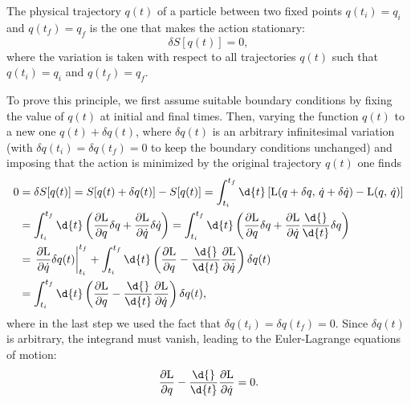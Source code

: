 \begin{theorem}
    The physical trajectory \(q(t)\) of a particle between two fixed points \(q(t_i) = q_i\) and \(q(t_f) = q_f\) is the one that makes the action stationary:
    \[
        \delta S[q(t)] = 0,
    \]
    where the variation is taken with respect to all trajectories \(q(t)\) such that \(q(t_i) = q_i\) and \(q(t_f) = q_f\).
\end{theorem}
To prove this principle, we first assume suitable boundary conditions by fixing the value of $q(t)$ at initial and final times. Then, varying the function $q(t)$ to a new one $q(t) + \delta q(t)$, where $\delta q(t)$ is an arbitrary infinitesimal variation (with $\delta q(t_i) = \delta q(t_f) = 0$ to keep the boundary conditions unchanged) and imposing that the action is minimized by the original trajectory $q(t)$ one finds
\[
    \begin{aligned}
        0 & = \delta S[q(t)] = S[q(t) + \delta q(t)] - S[q(t)] = \int_{t_i}^{t_f} \d{t} \left[ \mathrm{L}(q + \delta q,\,\dot{q} + \delta \dot{q}) - \mathrm{L}(q,\,\dot{q}) \right]                                                                                                                                                 \\
          & = \int_{t_i}^{t_f} \d{t} \left( \frac{\partial \mathrm{L}}{\partial q} \delta q + \frac{\partial \mathrm{L}}{\partial \dot{q}} \delta \dot{q} \right) = \int_{t_i}^{t_f} \d{t} \left( \frac{\partial \mathrm{L}}{\partial q} \delta q + \frac{\partial \mathrm{L}}{\partial \dot{q}} \frac{\d{}}{\d{t}} \delta q \right) \\
          & = \left. \frac{\partial \mathrm{L}}{\partial \dot{q}} \delta q(t) \right|_{t_i}^{t_f}  + \int_{t_i}^{t_f} \d{t} \left( \frac{\partial \mathrm{L}}{\partial q} - \frac{\d{}}{\d{t}} \frac{\partial \mathrm{L}}{\partial \dot{q}} \right) \delta q(t)                                                                      \\
          & = \int_{t_i}^{t_f} \d{t} \left( \frac{\partial \mathrm{L}}{\partial q} - \frac{\d{}}{\d{t}} \frac{\partial \mathrm{L}}{\partial \dot{q}} \right) \delta q(t),
    \end{aligned}
\]
where in the last step we used the fact that \(\delta q(t_i) = \delta q(t_f) = 0\). Since \(\delta q(t)\) is arbitrary, the integrand must vanish, leading to the Euler-Lagrange equations of motion:
\[
    \frac{\partial \mathrm{L}}{\partial q} - \frac{\d{}}{\d{t}} \frac{\partial \mathrm{L}}{\partial \dot{q}} = 0.
\]
